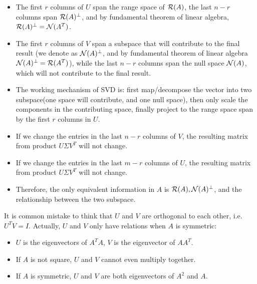 \begin{refsection}
\begin{note}\hfill
\begin{itemize}
    \item The first $r$ columns of $U$ span the range space of $\mathcal{R}(A)$, the last $n-r$ columns span $\mathcal{R}(A)^\perp$, and by fundamental theorem of linear algebra, $\mathcal{R}(A)^\perp = \mathcal{N}(A^T)$.
    \item The first $r$ columns of $V$ span a subspace that will contribute to the final result (we denote as $\mathcal{N}(A)^{\perp}$, and by fundamental theorem of linear algebra $\mathcal{N}(A)^{\perp} = \mathcal{R}(A^T)$), while the last $n-r$ columns span the null space $\mathcal{N}(A)$, which will not contribute to the final result. 
    \item The working mechanism of SVD is: first map/decompose the vector into two subspace(one space will contribute, and one null space), then only scale the components in the contributing space, finally project to the range space span by the first $r$ columns in $U$. 
\end{itemize}
\end{note}

\begin{remark}\hfill
\begin{itemize}
    \item If we change the entries in the last $n-r$ columns of $V$, the resulting matrix from product $U\Sigma V^T$ will not change. 
    \item If we change the entries in the last $m-r$ columns of $U$, the resulting matrix from product $U\Sigma V^T$ will not change. 
    \item Therefore, the only equivalent information in $A$ is $\mathcal{R}(A),\mathcal{N}(A)^\perp$, and the relationship between the two subspace. 
\end{itemize}
\end{remark}

\begin{remark}
It is common mistake to think that $U$ and $V$ are orthogonal to each other, i.e. $U^TV = I$. Actually, $U$ and $V$ only have relations when $A$ is symmetric:
\begin{itemize}
	\item $U$ is the eigenvectors of $A^TA$, $V$ is the eigenvector of $AA^T$.  
	\item If $A$ is not square, $U$ and $V$ cannot even multiply together. 
	\item If $A$ is symmetric, $U$ and $V$ are both eigenvectors of $A^2$ and $A$.
\end{itemize}
\end{remark}




\end{refsection}
